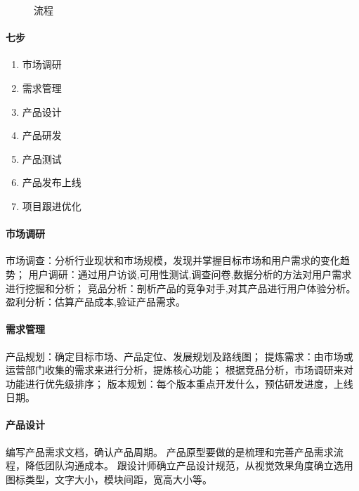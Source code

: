 \documentclass[letterpaper,11pt,english]{sphinxmanual}
\begin{document}
\begin{figure}[H]
\centering
\capstart

\noindent{}
\caption{流程}\label{\detokenize{chapter_project/process:id35}}\end{figure}


\paragraph{七步}
\label{\detokenize{chapter_project/process:id5}}\begin{enumerate}
%
\item {} 
市场调研

\item {} 
需求管理

\item {} 
产品设计

\item {} 
产品研发

\item {} 
产品测试

\item {} 
产品发布上线

\item {} 
项目跟进优化

\end{enumerate}


\paragraph{市场调研}
\label{\detokenize{chapter_project/process:id6}}
市场调查：分析行业现状和市场规模，发现并掌握目标市场和用户需求的变化趋势；
用户调研：通过用户访谈,可用性测试,调查问卷,数据分析的方法对用户需求进行挖掘和分析；
竞品分析：剖析产品的竞争对手,对其产品进行用户体验分析。
盈利分析：估算产品成本,验证产品需求。


\paragraph{需求管理}
\label{\detokenize{chapter_project/process:id7}}
产品规划：确定目标市场、产品定位、发展规划及路线图；
提炼需求：由市场或运营部门收集的需求来进行分析，提炼核心功能；
根据竞品分析，市场调研来对功能进行优先级排序；
版本规划：每个版本重点开发什么，预估研发进度，上线日期。


\paragraph{产品设计}
\label{\detokenize{chapter_project/process:id8}}
编写产品需求文档，确认产品周期。
产品原型要做的是梳理和完善产品需求流程，降低团队沟通成本。
跟设计师确立产品设计规范，从视觉效果角度确立选用图标类型，文字大小，模块间距，宽高大小等。
\end{document}
